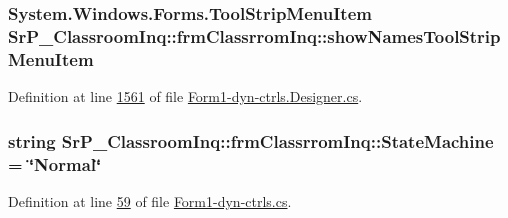\hypertarget{class_sr_p___classroom_inq_1_1frm_classrrom_inq_a128944d3506ac87f9278cc8917a9e6f0}{
\subsubsection[{show\-Names\-Tool\-Strip\-Menu\-Item}]{\setlength{\rightskip}{0pt plus 5cm}\-System.\-Windows.\-Forms.\-Tool\-Strip\-Menu\-Item {\bf \-Sr\-P\-\_\-\-Classroom\-Inq\-::frm\-Classrrom\-Inq\-::show\-Names\-Tool\-Strip\-Menu\-Item}}}
\label{class_sr_p___classroom_inq_1_1frm_classrrom_inq_a128944d3506ac87f9278cc8917a9e6f0}


\-Definition at line \hyperlink{_form1-dyn-ctrls_8_designer_8cs_source_l01561}{1561} of file \hyperlink{_form1-dyn-ctrls_8_designer_8cs_source}{\-Form1-\/dyn-\/ctrls.\-Designer.\-cs}.

\hypertarget{class_sr_p___classroom_inq_1_1frm_classrrom_inq_a4858c67d60a267f02e6c97085f2aee71}{
\subsubsection[{\-State\-Machine}]{\setlength{\rightskip}{0pt plus 5cm}string {\bf \-Sr\-P\-\_\-\-Classroom\-Inq\-::frm\-Classrrom\-Inq\-::\-State\-Machine} = \char`\"{}\-Normal\char`\"{}}}
\label{class_sr_p___classroom_inq_1_1frm_classrrom_inq_a4858c67d60a267f02e6c97085f2aee71}


\-Definition at line \hyperlink{_form1-dyn-ctrls_8cs_source_l00059}{59} of file \hyperlink{_form1-dyn-ctrls_8cs_source}{\-Form1-\/dyn-\/ctrls.\-cs}.

